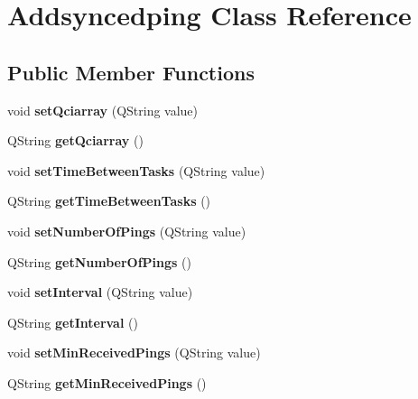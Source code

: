 \hypertarget{class_addsyncedping}{}\section{Addsyncedping Class Reference}
\label{class_addsyncedping}
\subsection*{Public Member Functions}
\begin{DoxyCompactItemize}
\item 
void {\bfseries set\+Qciarray} (Q\+String value)\hypertarget{class_addsyncedping_a5b389118af6eca8e4083b6d8a6da97c5}{}\label{class_addsyncedping_a5b389118af6eca8e4083b6d8a6da97c5}

\item 
Q\+String {\bfseries get\+Qciarray} ()\hypertarget{class_addsyncedping_ac48015c9fa95122d800de516107c37c1}{}\label{class_addsyncedping_ac48015c9fa95122d800de516107c37c1}

\item 
void {\bfseries set\+Time\+Between\+Tasks} (Q\+String value)\hypertarget{class_addsyncedping_af0d50a7354d7f3cf690f3b8b93911a9d}{}\label{class_addsyncedping_af0d50a7354d7f3cf690f3b8b93911a9d}

\item 
Q\+String {\bfseries get\+Time\+Between\+Tasks} ()\hypertarget{class_addsyncedping_a5b1c80801c5236cad77f38578897bd80}{}\label{class_addsyncedping_a5b1c80801c5236cad77f38578897bd80}

\item 
void {\bfseries set\+Number\+Of\+Pings} (Q\+String value)\hypertarget{class_addsyncedping_a0f44a47c8d7c51b2a3576a0d05a07c62}{}\label{class_addsyncedping_a0f44a47c8d7c51b2a3576a0d05a07c62}

\item 
Q\+String {\bfseries get\+Number\+Of\+Pings} ()\hypertarget{class_addsyncedping_ae1abdb02160424820625cde3788b0907}{}\label{class_addsyncedping_ae1abdb02160424820625cde3788b0907}

\item 
void {\bfseries set\+Interval} (Q\+String value)\hypertarget{class_addsyncedping_a342e8e1037356fba744909dd6ef567ba}{}\label{class_addsyncedping_a342e8e1037356fba744909dd6ef567ba}

\item 
Q\+String {\bfseries get\+Interval} ()\hypertarget{class_addsyncedping_aace042931436f9efdf571be7c75e9177}{}\label{class_addsyncedping_aace042931436f9efdf571be7c75e9177}

\item 
void {\bfseries set\+Min\+Received\+Pings} (Q\+String value)\hypertarget{class_addsyncedping_a3194c506769328812f6a28a920455fe7}{}\label{class_addsyncedping_a3194c506769328812f6a28a920455fe7}

\item 
Q\+String {\bfseries get\+Min\+Received\+Pings} ()\hypertarget{class_addsyncedping_a1bf7863bcb311113757bad5317d88963}{}\label{class_addsyncedping_a1bf7863bcb311113757bad5317d88963}

\end{DoxyCompactItemize}


